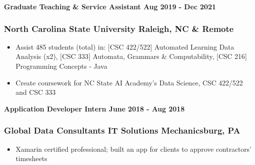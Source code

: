\vspace{-4pt}

\noindent\textbf{Graduate Teaching \& Service Assistant \hfill Aug 2019 - Dec 2021}
\subsubsection{North Carolina State University \hfill Raleigh, NC \& Remote}
\vspace{-2pt}
\begin{itemize}
\setlength\itemsep{-0.5em}
	\item Assist 485 students (total) in: {\footnotesize $[$CSC 422/522$]$} Automated Learning Data Analysis (x2), {\footnotesize $[$CSC 333$]$} Automata, Grammars \& Computability, {\footnotesize $[$CSC 216$]$} Programming Concepts - Java
    \item Create coursework for NC State AI Academy's Data Science, CSC 422/522 and CSC 333
\end{itemize}

\vspace{-4pt}

\noindent\textbf{Application Developer Intern \hfill June 2018 - Aug 2018}
\subsubsection{Global Data Consultants IT Solutions \hfill Mechanicsburg, PA}
\vspace{-2pt}
\begin{itemize}
\setlength\itemsep{-0.5em}
	\item Xamarin certified professional; built an app for clients to approve contractors' timesheets
\end{itemize}